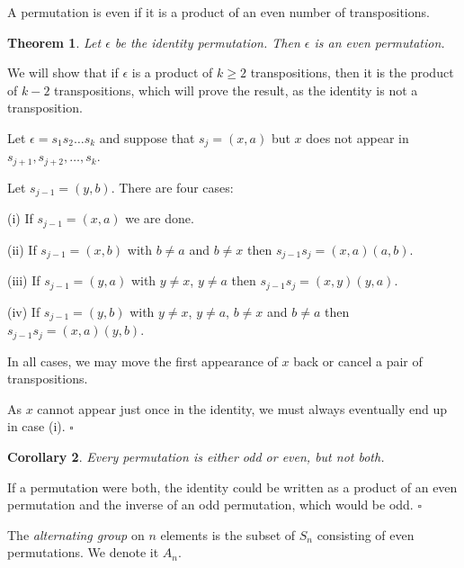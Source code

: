 \documentclass[10pt]{article}
\newtheorem{theorem}{Theorem}[section]
\newtheorem{corollary}[theorem]{Corollary}
\newenvironment{proof}[1][Proof]{\begin{trivlist}
\item[\hskip \labelsep {\itshape #1}]}{\end{trivlist}}
\newenvironment{definition}[1][Definition]{\begin{trivlist}
\item[\hskip \labelsep {\bfseries #1}]}{\end{trivlist}}
\begin{document}
\begin{definition}
A permutation is even if it is a product of an even number of transpositions.
\end{definition}

\begin{theorem}
Let $\epsilon$ be the identity permutation. Then $\epsilon$ is an even permutation.
\end{theorem}

\begin{proof}
We will show that if $\epsilon$ is a product of $k \geq 2$ transpositions, then it is the product of $k - 2$ transpositions, which will prove the result, as the identity is not a transposition.

Let $\epsilon = s_1s_2\ldots s_k$ and suppose that $s_j = (x, a)$ but $x$ does not appear in $s_{j+1}, s_{j+2}, \ldots, s_k$.

Let $s_{j-1} = (y, b)$. There are four cases:

(i) If $s_{j-1} = (x, a)$ we are done.

(ii) If $s_{j-1} = (x, b)$ with $b \neq a$ and $b \neq x$ then $s_{j-1}s_j = (x, a)(a, b)$.

(iii) If $s_{j-1} = (y, a)$ with $y \neq x$, $y \neq a$ then $s_{j-1}s_j = (x, y)(y, a)$.

(iv) If $s_{j-1} = (y, b)$ with $y \neq x$, $y \neq a$, $b \neq x$ and $b\neq a$ then $s_{j-1}s_j = (x, a)(y, b)$.

In all cases, we may move the first appearance of $x$ back or cancel a pair of transpositions.

As $x$ cannot appear just once in the identity, we must always eventually end up in case (i). $\square$
\end{proof}

\begin{corollary}
Every permutation is either odd or even, but not both.
\end{corollary}

\begin{proof}
If a permutation were both, the identity could be written as a product of an even permutation and the inverse of an odd permutation, which would be odd. $\square$
\end{proof}

\begin{definition}
The \emph{alternating group} on $n$ elements is the subset of $S_n$ consisting of even permutations. We denote it $A_n$.
\end{definition}
\end{document}
